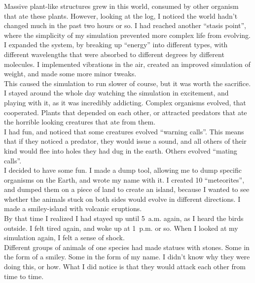 \documentclass[a5paper]{scrartcl}
\begin{document}
Massive plant-like structures grew in this world, consumed by other organism that ate these plants. However, looking at the log, I noticed the world hadn't changed much in the past two hours or so. I had reached another \enquote{stasis point}, where the simplicity of my simulation prevented more complex life from evolving.\\


I expanded the system, by breaking up \enquote{energy} into different types, with different wavelengths that were absorbed to different degrees by different molecules. I implemented vibrations in the air, created an improved simulation of weight, and made some more minor tweaks.\\


This caused the simulation to run slower of course, but it was worth the sacrifice. I stayed around the whole day watching the simulation in excitement, and playing with it, as it was incredibly addicting. Complex organisms evolved, that cooperated. Plants that depended on each other, or attracted predators that ate the horrible looking creatures that ate from them.\\


I had fun, and noticed that some creatures evolved \enquote{warning calls}. This means that if they noticed a predator, they would issue a sound, and all others of their kind would flee into holes they had dug in the earth. Others evolved \enquote{mating calls}.\\


I decided to have some fun. I made a dump tool, allowing me to dump specific organisms on the Earth, and wrote my name with it. I created 10 \enquote{meteorites}, and dumped them on a piece of land to create an island, because I wanted to see whether the animals stuck on both sides would evolve in different directions. I made a smiley-island with volcanic eruptions.\\


By that time I realized I had stayed up until 5~a.m. again, as I heard the birds outside. I felt tired again, and woke up at 1~p.m. or so. When I looked at my simulation again, I felt a sense of shock.\\


Different groups of animals of one species had made statues with stones. Some in the form of a smiley. Some in the form of my name. I didn't know why they were doing this, or how. What I did notice is that they would attack each other from time to time.\\
\end{document}
